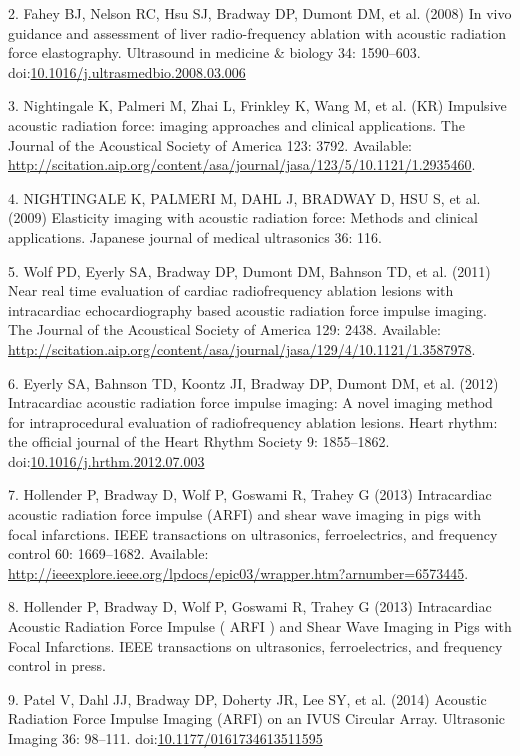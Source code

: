 \documentclass[]{article}
\begin{document}
2. Fahey BJ, Nelson RC, Hsu SJ, Bradway DP, Dumont DM, et al. (2008) In
vivo guidance and assessment of liver radio-frequency ablation with
acoustic radiation force elastography. Ultrasound in medicine \& biology
34: 1590--603.
doi:\href{http://dx.doi.org/10.1016/j.ultrasmedbio.2008.03.006}{10.1016/j.ultrasmedbio.2008.03.006}

3. Nightingale K, Palmeri M, Zhai L, Frinkley K, Wang M, et al. (KR)
Impulsive acoustic radiation force: imaging approaches and clinical
applications. The Journal of the Acoustical Society of America 123:
3792. Available:
\url{http://scitation.aip.org/content/asa/journal/jasa/123/5/10.1121/1.2935460}.

4. NIGHTINGALE K, PALMERI M, DAHL J, BRADWAY D, HSU S, et al. (2009)
Elasticity imaging with acoustic radiation force: Methods and clinical
applications. Japanese journal of medical ultrasonics 36: 116.

5. Wolf PD, Eyerly SA, Bradway DP, Dumont DM, Bahnson TD, et al. (2011)
Near real time evaluation of cardiac radiofrequency ablation lesions
with intracardiac echocardiography based acoustic radiation force
impulse imaging. The Journal of the Acoustical Society of America 129:
2438. Available:
\url{http://scitation.aip.org/content/asa/journal/jasa/129/4/10.1121/1.3587978}.

6. Eyerly SA, Bahnson TD, Koontz JI, Bradway DP, Dumont DM, et al.
(2012) Intracardiac acoustic radiation force impulse imaging: A novel
imaging method for intraprocedural evaluation of radiofrequency ablation
lesions. Heart rhythm: the official journal of the Heart Rhythm Society
9: 1855--1862.
doi:\href{http://dx.doi.org/10.1016/j.hrthm.2012.07.003}{10.1016/j.hrthm.2012.07.003}

7. Hollender P, Bradway D, Wolf P, Goswami R, Trahey G (2013)
Intracardiac acoustic radiation force impulse (ARFI) and shear wave
imaging in pigs with focal infarctions. IEEE transactions on
ultrasonics, ferroelectrics, and frequency control 60: 1669--1682.
Available:
\url{http://ieeexplore.ieee.org/lpdocs/epic03/wrapper.htm?arnumber=6573445}.

8. Hollender P, Bradway D, Wolf P, Goswami R, Trahey G (2013)
Intracardiac Acoustic Radiation Force Impulse ( ARFI ) and Shear Wave
Imaging in Pigs with Focal Infarctions. IEEE transactions on
ultrasonics, ferroelectrics, and frequency control in press.

9. Patel V, Dahl JJ, Bradway DP, Doherty JR, Lee SY, et al. (2014)
Acoustic Radiation Force Impulse Imaging (ARFI) on an IVUS Circular
Array. Ultrasonic Imaging 36: 98--111.
doi:\href{http://dx.doi.org/10.1177/0161734613511595}{10.1177/0161734613511595}
\end{document}
